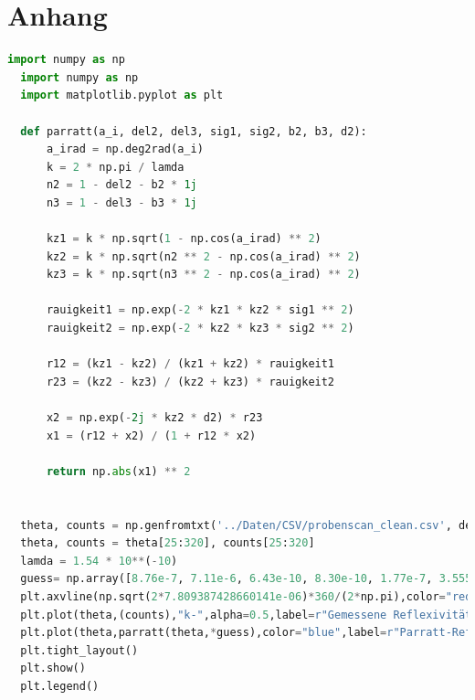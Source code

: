 \documentclass[12pt]{article}
\begin{document}
\section{Anhang}\label{sec:anhang}
\begin{lstlisting}[language=Python, caption={Parratt Implementation}, label={lst:python_code}, basicstyle=\footnotesize]  import numpy as np
  import numpy as np
  import matplotlib.pyplot as plt
  
  def parratt(a_i, del2, del3, sig1, sig2, b2, b3, d2):
      a_irad = np.deg2rad(a_i)
      k = 2 * np.pi / lamda
      n2 = 1 - del2 - b2 * 1j
      n3 = 1 - del3 - b3 * 1j
  
      kz1 = k * np.sqrt(1 - np.cos(a_irad) ** 2)
      kz2 = k * np.sqrt(n2 ** 2 - np.cos(a_irad) ** 2)
      kz3 = k * np.sqrt(n3 ** 2 - np.cos(a_irad) ** 2)
  
      rauigkeit1 = np.exp(-2 * kz1 * kz2 * sig1 ** 2)
      rauigkeit2 = np.exp(-2 * kz2 * kz3 * sig2 ** 2)
  
      r12 = (kz1 - kz2) / (kz1 + kz2) * rauigkeit1
      r23 = (kz2 - kz3) / (kz2 + kz3) * rauigkeit2
  
      x2 = np.exp(-2j * kz2 * d2) * r23
      x1 = (r12 + x2) / (1 + r12 * x2)
  
      return np.abs(x1) ** 2
  
  
  theta, counts = np.genfromtxt('../Daten/CSV/probenscan_clean.csv', delimiter=',', unpack=True)
  theta, counts = theta[25:320], counts[25:320]
  lamda = 1.54 * 10**(-10)
  guess= np.array([8.76e-7, 7.11e-6, 6.43e-10, 8.30e-10, 1.77e-7, 3.555e-08, 8.73e-8])
  plt.axvline(np.sqrt(2*7.809387428660141e-06)*360/(2*np.pi),color="red",label=r"Bestimmter kritischer Winkel von Silizium")
  plt.plot(theta,(counts),"k-",alpha=0.5,label=r"Gemessene Reflexivität")
  plt.plot(theta,parratt(theta,*guess),color="blue",label=r"Parratt-Reflexivität")
  plt.tight_layout()
  plt.show()
  plt.legend()
  \end{lstlisting}
\end{document}
